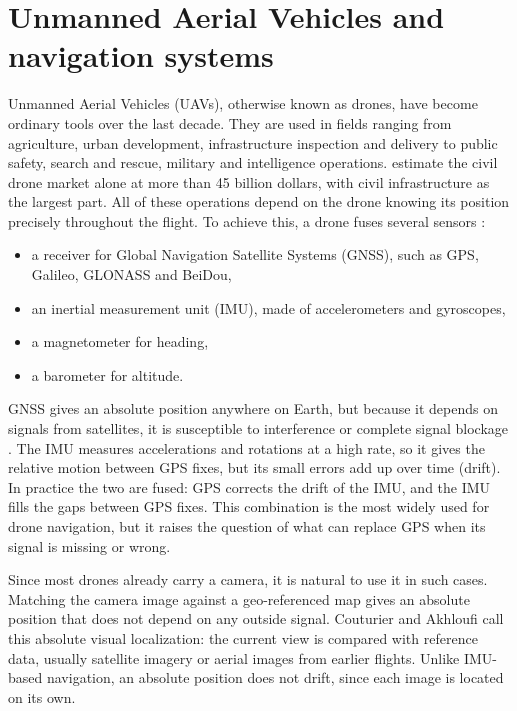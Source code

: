 \documentclass[english, Lau, oneside]{sapthesis}%
\begin{document}
\section{Unmanned Aerial Vehicles and navigation systems}
\label{sec:intro-uav}
Unmanned Aerial Vehicles (UAVs), otherwise known as drones, have become ordinary tools over the last decade. They are used in fields ranging from agriculture, urban development, infrastructure inspection and delivery to public safety, search and rescue, military and intelligence operations. \citet{shakhatreh2019survey} estimate the civil drone market alone at more than 45 billion dollars, with civil infrastructure as the largest part. All of these operations depend on the drone knowing its position precisely throughout the flight. To achieve this, a drone fuses several sensors \citep{liu2025survey}:

\begin{itemize}
\item a receiver for Global Navigation Satellite Systems (GNSS), such as GPS, Galileo, GLONASS and BeiDou,
\item an inertial measurement unit (IMU), made of accelerometers and gyroscopes,
\item a magnetometer for heading,
\item a barometer for altitude.
\end{itemize}

GNSS gives an absolute position anywhere on Earth, but because it depends on signals from satellites, it is susceptible to interference or complete signal blockage \citep{liu2025survey}. The IMU measures accelerations and rotations at a high rate, so it gives the relative motion between GPS fixes, but its small errors add up over time (drift). In practice the two are fused: GPS corrects the drift of the IMU, and the IMU fills the gaps between GPS fixes. This combination is the most widely used for drone navigation, but it raises the question of what can replace GPS when its signal is missing or wrong.

Since most drones already carry a camera, it is natural to use it in such cases. Matching the camera image against a geo-referenced map gives an absolute position that does not depend on any outside signal. Couturier and Akhloufi \citeyearpar{couturier2024avl} call this absolute visual localization: the current view is compared with reference data, usually satellite imagery or aerial images from earlier flights. Unlike IMU-based navigation, an absolute position does not drift, since each image is located on its own.
\end{document}

